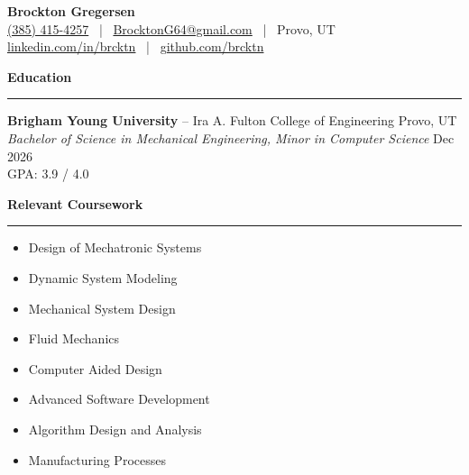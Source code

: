 \documentclass[a4paper,10pt]{article}
\newcommand{\sectionline}{\noindent\rule{\linewidth}{1pt}\vspace{-0.5em}}  %
\begin{document}
\begin{center}
    {\huge \textbf{Brockton Gregersen}} \\
    \href{tel:+13854154257}{(385) 415-4257} \ | \ \href{mailto:BrocktonG64@gmail.com}{BrocktonG64@gmail.com} \ | \ Provo, UT \\
    \href{https://linkedin.com/in/brcktn}{linkedin.com/in/brcktn} \ | \ \href{https://github.com/brcktn}{github.com/brcktn}
\end{center}

\textbf{\large Education} \vspace{-1em}\\
\sectionline

\textbf{Brigham Young University} -- Ira A. Fulton College of Engineering \hfill Provo, UT \\
\emph{Bachelor of Science in Mechanical Engineering, Minor in Computer Science} \hfill Dec 2026 \\
GPA: 3.9 / 4.0

\textbf{\large Relevant Coursework} \vspace{-1em}\\
\sectionline
\vspace{-0.5em}
\begin{multicols}{2}
    \begin{itemize}[noitemsep, topsep=0pt]
        \item Design of Mechatronic Systems
        \item Dynamic System Modeling
        \item Mechanical System Design
        \item Fluid Mechanics
    \end{itemize}

    \columnbreak

    \begin{itemize}[noitemsep, topsep=0pt]
        \item Computer Aided Design
        \item Advanced Software Development
        \item Algorithm Design and Analysis
        \item Manufacturing Processes
    \end{itemize}
\end{multicols}
\vspace{-1em}
\end{document}
